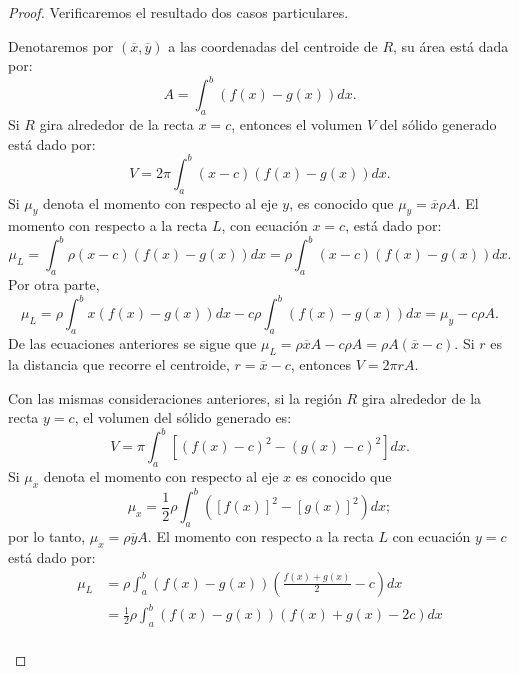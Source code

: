 \begin{teorema} 
\end{teorema}
\begin{proof}
  Verificaremos el resultado dos casos particulares.
  \begin{parrafoitemize}
  \item Denotaremos por $(\overline{x},\overline{y})$ a las coordenadas del centroide de $R$,
    su área está dada por: \[A=\int_{a}^{b}\left(f(x)-g(x) \right) dx.\]
    Si $R$ gira alrededor de la recta $x=c$, entonces el volumen $V$ del sólido generado está dado por:
    \[V=2\pi \int_{a}^{b}(x-c) \left( f(x) -g(x) \right) dx.\]
    Si $\mu_y$ denota el momento con respecto al eje $y$, es conocido que $\mu_y= \overline{x}\rho A$.
    El momento con respecto a la recta $L$, con ecuación $x=c$, está dado por:
    \[\mu _{L}=\int_{a}^{b}\rho (x-c) \left( f(x)-g(x) \right) dx=\rho \int_{a}^{b}(x-c) \left(f(x) -g(x) \right) dx.\]
    Por otra parte,
    \[\mu_{L}=\rho\int_{a}^{b}x\left(f(x)-g(x)\right)dx-c\rho\int_{a}^{b}\left(f(x)-g(x)\right)dx=\mu_y-c\rho A.\]
    De las ecuaciones anteriores se sigue que $\mu_{L}=\rho \overline{x} A-c\rho A= \rho A (\overline{x}-c)$.
    Si $r$ es la distancia que recorre el centroide, $r=\overline{x}-c$, entonces $V= 2 \pi r A$.
  \item Con las mismas consideraciones anteriores, si la región $R$ gira alrededor de la recta $y=c$,
    el volumen del sólido generado es:
    \[V=\pi \int_{a}^{b}\left[ \left( f(x) -c\right) ^{2}-\left(g(x) -c\right) ^{2}\right] dx.\]
    Si $\mu_x$ denota el momento con respecto al eje $x$ es conocido que
    \[\mu_x= \frac{1}{2}\rho \int_{a}^{b}\left( [f(x)]^2 -[g(x)]^2\right)dx;\]
    por lo tanto, $\mu_x= \rho\overline{y} A$. El momento con respecto a la recta $L$ con ecuación $y=c$ está dado por:
    \begin{align*}
      \mu _{L}&=\rho \int_{a}^{b}\left( f(x) -g(x) \right)\left( \frac{f(x) +g(x) }{2}-c\right) dx \\
      & = \frac{1}{2}\rho \int_{a}^{b}\left( f(x) -g(x)\right) \left( f(x) +g(x) -2c\right) dx \\

\end{align*}
\end{parrafoitemize}
\end{proof}
